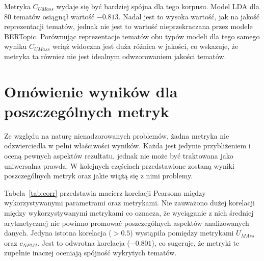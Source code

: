 	Metryka \(C_{UMass}\) wydaje się być bardziej spójna dla tego korpusu.
	Model LDA dla 80 tematów osiągnął wartość \(-0.813\).
	Nadal jest to wysoka wartość, jak na jakość reprezentacji tematów, jednak nie jest to wartość nieprzekraczana przez modele BERTopic.
	Porównując reprezentacje tematów obu typów modeli dla tego samego wyniku \(C_{UMass}\) wciąż widoczna jest duża różnica w jakości,
		co wskazuje, że metryka ta również nie jest idealnym odwzorowaniem jakości tematów.
	
\section{Omówienie wyników dla poszczególnych metryk}
	Ze względu na naturę nienadzorowanych problemów, żadna metryka nie odzwierciedla w pełni właściwości wyników.
	Każda jest jedynie przybliżeniem i oceną pewnych aspektów rezultatu, jednak nie może być traktowana jako uniwersalna prawda.
	W kolejnych częściach przedstawione zostaną wyniki poszczególnych metryk oraz jakie wiążą się z nimi problemy.

	Tabela~\ref{tab:corr} przedstawia macierz korelacji Pearsona między wykorzystywanymi parametrami oraz metrykami.
	Nie zauważono dużej korelacji między wykorzystywanymi metrykami co oznacza,
		że wyciąganie z nich średniej arytmetycznej nie powinno promować poszczególnych aspektów analizowanych danych.
	Jedyna istotna korelacja (\(>0.5\)) wystąpiła pomiędzy metrykami \(U_{MAss}\) oraz \(c_{NPMI}\).
	Jest to odwrotna korelacja (\(-0.801\)), co sugeruje, że metryki te zupełnie inaczej oceniają spójność wykrytych tematów.

